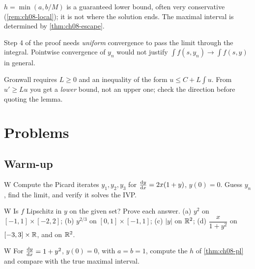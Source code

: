 \begin{pitfall}\label{pit:ch08-h}
$h = \min(a,b/M)$ is a guaranteed lower bound, often very conservative
(\cref{rem:ch08-local}); it is not where the solution ends. The maximal
interval is determined by \cref{thm:ch08-escape}.
\end{pitfall}

\begin{pitfall}\label{pit:ch08-uniform}
Step 4 of the proof needs \emph{uniform} convergence to pass the limit through
the integral. Pointwise convergence of $y_n$ would not justify
$\int f(s,y_n)\to\int f(s,y)$ in general.
\end{pitfall}

\begin{pitfall}\label{pit:ch08-gronwall-sign}
Gronwall requires $L\ge0$ and an inequality of the form $u\le C + L\int u$.
From $u'\ge Lu$ you get a \emph{lower} bound, not an upper one; check the
direction before quoting the lemma.
\end{pitfall}

\section{Problems}\label{sec:ch08-problems}

\subsection*{Warm-up}

\begin{problem}{W}\label{prob:ch08-w1}
Compute the Picard iterates $y_1,y_2,y_3$ for $\frac{\mathrm{d}y}{\mathrm{d}x} = 2x(1 + y)$, $y(0) = 0$.
Guess $y_n$, find the limit, and verify it solves the IVP.
\end{problem}

\begin{problem}{W}\label{prob:ch08-w2}
Is $f$ Lipschitz in $y$ on the given set? Prove each answer.
(a) $y^2$ on $[-1,1]\times[-2,2]$;
(b) $y^{2/3}$ on $[0,1]\times[-1,1]$;
(c) $|y|$ on $\mathbb{R}^2$;
(d) $\dfrac{x}{1 + y^2}$ on $[-3,3]\times\mathbb{R}$, and on $\mathbb{R}^2$.
\end{problem}

\begin{problem}{W}\label{prob:ch08-w3}
For $\frac{\mathrm{d}y}{\mathrm{d}x} = 1 + y^2$, $y(0) = 0$, with $a = b = 1$, compute the $h$ of
\cref{thm:ch08-pl} and compare with the true maximal interval.
\end{problem}

